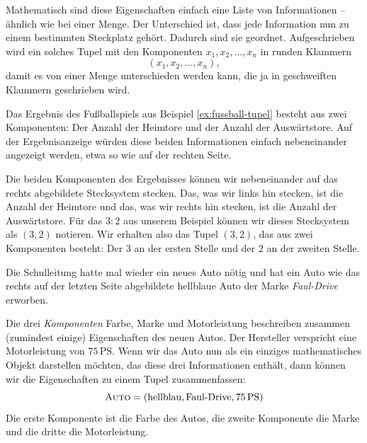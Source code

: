 \documentclass[../../main.tex]{subfiles}
\begin{document}
Mathematisch sind diese Eigenschaften einfach eine Liste von Informationen -- ähnlich wie bei einer Menge. Der Unterschied ist, dass jede Information nun zu einem bestimmten Steckplatz gehört. Dadurch sind sie geordnet. Aufgeschrieben wird ein solches Tupel mit den Komponenten $x_1,x_2,\dots,x_n$ in runden Klammern
\[(x_1,x_2,\dots,x_n),\]
damit es von einer Menge unterschieden werden kann, die ja in geschweiften Klammern geschrieben wird.

\begin{example}{}
    Das Ergebnis des Fußballspiels aus Beispiel \ref{ex:fussball-tupel} besteht aus zwei Komponenten: Der Anzahl der Heimtore und der Anzahl der Auswärtstore. Auf der Ergebnisanzeige würden diese beiden Informationen einfach nebeneinander angezeigt werden, etwa so wie auf der rechten Seite. 
    
    Die beiden Komponenten des Ergebnisses können wir nebeneinander auf das rechts abgebildete Stecksystem stecken. Das, was wir links hin stecken, ist die Anzahl der Heimtore und das, was wir rechts hin stecken, ist die Anzahl der Auswärtstore. Für das $3:2$ aus unserem Beispiel können wir dieses Stecksystem als $(3,2)$ notieren. Wir erhalten also das Tupel $(3,2)$, das aus zwei Komponenten besteht: Der $3$ an der ersten Stelle und der $2$ an der zweiten Stelle.
\end{example}

\begin{example}{}
    Die Schulleitung hatte mal wieder ein neues Auto nötig und hat ein Auto wie das rechts auf der letzten Seite abgebildete hellblaue Auto der Marke \emph{Faul-Drive} erworben.

    Die drei \emph{Komponenten} Farbe, Marke und Motorleistung beschreiben zusammen (zumindest einige) Eigenschaften des neuen Autos. Der Hersteller verspricht eine Motorleistung von $75\,\text{PS}$. Wenn wir das Auto nun als ein einziges mathematisches Objekt darstellen möchten, das diese drei Informationen enthält, dann können wir die Eigenschaften zu einem Tupel zusammenfassen:
    \[\textsc{Auto}=(\text{hellblau}, \text{Faul-Drive}, 75\,\text{PS})\]
    Die erste Komponente ist die Farbe des Autos, die zweite Komponente die Marke und die dritte die Motorleistung.
\end{example}
\end{document}
